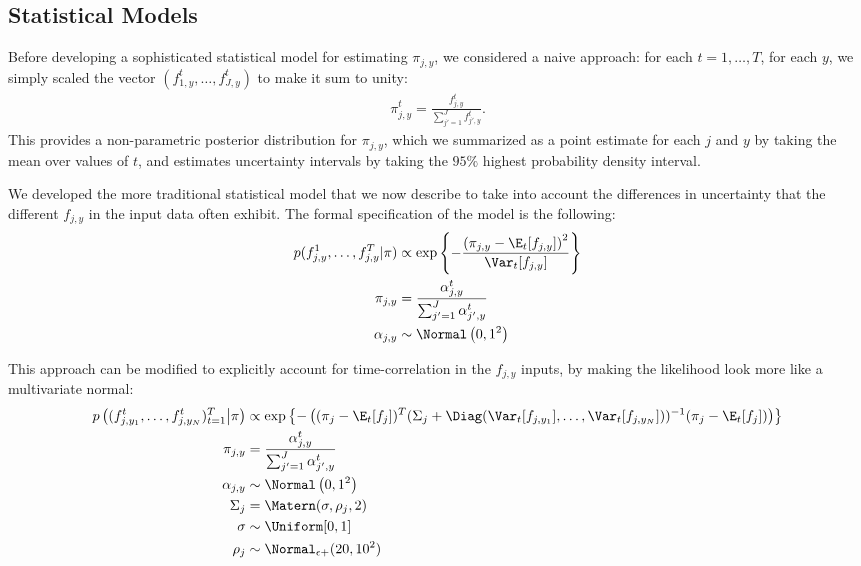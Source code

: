   \subsection*{Statistical Models}
  Before developing a sophisticated statistical model for estimating
  $\pi_{j,y}$, we considered a naive approach: for each
  $t=1,\ldots,T$, for each $y$, we simply scaled the vector
  $(f_{1,y}^t, \ldots, f_{J,y}^t)$ to make it sum to unity:
  \begin{align*}
    \pi_{j,y}^t = \frac{f_{j,y}^t}{\sum_{j'=1}^J f_{j',y}^t}.
  \end{align*}
  This provides a non-parametric posterior distribution for
  $\pi_{j,y}$, which we summarized as a point estimate for each $j$
  and $y$ by taking the mean over values of $t$, and estimates
  uncertainty intervals by taking the $95\%$ highest probability
  density interval.

  We developed the more traditional statistical model that we now
  describe to take into account the differences in uncertainty that
  the different $f_{j,y}$ in the input data often exhibit.  The formal
  specification of the model is the following:
  \begin{align*}
    p(f_{j,y}^1,\ldots,f_{j,y}^T | \pi) &\propto \exp\left\{-\frac{\left(\pi_{j,y}-\E_t[f_{j,y}]\right)^2}{\Var_t[f_{j,y}]} \right\}\\
    \pi_{j,y} &= \frac{\alpha_{j,y}^t}{\sum_{j'=1}^J \alpha_{j',y}^t}\\
    \alpha_{j,y} &\sim \Normal\left(0, 1^2\right)
  \end{align*}

 This approach can be modified to explicitly account for time-correlation in the
 $f_{j,y}$ inputs, by making the likelihood look more like a
 multivariate normal:
  \begin{align*}
    p\left((f_{j,y_1}^t,\ldots,f_{j,y_N}^t)_{t=1}^T \big| \pi \right)
    &\propto \exp\left\{-\left((\pi_j - \E_t[f_j])^T (\Sigma_j + \Diag(\Var_t[f_{j,y_1}],
      \ldots, \Var_t[f_{j,y_N}])) ^{-1} (\pi_j - \E_t[f_j])\right) \right\}\\
    \pi_{j,y} &= \frac{\alpha_{j,y}^t}{\sum_{j'=1}^J \alpha_{j',y}^t}\\
    \alpha_{j,y} &\sim \Normal\left(0, 1^2\right)\\
    \Sigma_j &= \Matern(\sigma, \rho_j, 2)\\
    \sigma &\sim \Uniform[0,1]\\
    \rho_j &\sim \Normal_{\epsilon+}(20, 10^2)
  \end{align*}


